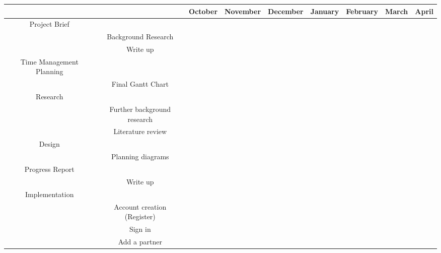     \begin{sidewaystable}[h]
        \centering
        \begin{tabular}{|c|c|c|c|c|c|c|c|c|}
            \hline
            & & October & November & December & January & February & March & April\\
            \hline
            \hline
            Project Brief & & \cellcolor{gray} & & & & & & \\
            \hline
            & Background Research & \cellcolor{lightgray} & & & & & & \\
            \hline
            & Write up & \cellcolor{lightgray} & & & & & & \\
            \hline
            \hline
            Time Management Planning & & \cellcolor{gray} & \cellcolor{gray} & \cellcolor{gray} & & & & \\
            \hline
            & Final Gantt Chart & \cellcolor{lightgray} & \cellcolor{lightgray} & \cellcolor{lightgray} & & & & \\
            \hline
            \hline
            Research & & \cellcolor{gray} & \cellcolor{gray} & \cellcolor{gray} & & & & \\
            \hline
            & Further background research & \cellcolor{lightgray} & \cellcolor{lightgray} & & & & & \\
            \hline
            & Literature review & & \cellcolor{lightgray} & \cellcolor{lightgray} & & & & \\
            \hline
            \hline
            Design & & & \cellcolor{gray} & & & & & \\
            \hline
            & Planning diagrams & & \cellcolor{lightgray} & & & & & \\
            \hline
            \hline
            Progress Report & & & \cellcolor{gray} & \cellcolor{gray} & & & & \\
            \hline
            & Write up & & \cellcolor{lightgray} & \cellcolor{lightgray} & & & & \\
            \hline
            \hline
            Implementation & & & & \cellcolor{gray} & \cellcolor{gray} & \cellcolor{gray} & & \\
            \hline
            & Account creation (Register) & & & \cellcolor{lightgray} & & & & \\
            \hline
            & Sign in & & & \cellcolor{lightgray} & & & & \\
            \hline
            & Add a partner & & & \cellcolor{lightgray} & \cellcolor{lightgray} & & & \\

\end{tabular}
\end{sidewaystable}

